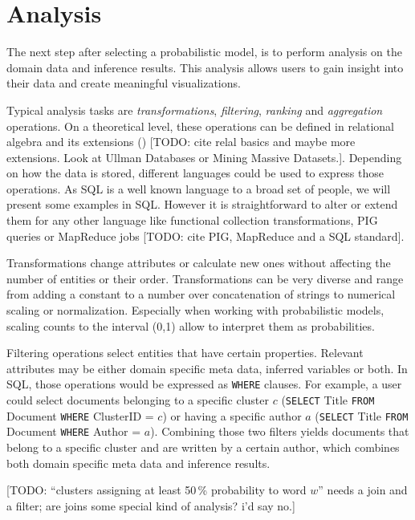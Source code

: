 \section{Analysis}

The next step after selecting a probabilistic model, is to perform analysis on the domain data and inference results. This analysis allows users to gain insight into their data and create meaningful visualizations.

Typical analysis tasks are \emph{transformations}, \emph{filtering}, \emph{ranking} and \emph{aggregation} operations. On a theoretical level, these operations can be defined in relational algebra and its extensions (\cite{ozsoyouglu1987extending, klug1982equivalence}) [TODO: cite relal basics and maybe more extensions. Look at Ullman Databases or Mining Massive Datasets.]. Depending on how the data is stored, different languages could be used to express those operations. As SQL is a well known language to a broad set of people, we will present some examples in SQL. However it is straightforward to alter or extend them for any other language like functional collection transformations, PIG queries or MapReduce jobs [TODO: cite PIG, MapReduce and a SQL standard].

Transformations change attributes or calculate new ones without affecting the number of entities or their order. Transformations can be very diverse and range from adding a constant to a number over concatenation of strings to numerical scaling or normalization. Especially when working with probabilistic models, scaling counts to the interval (0,1) allow to interpret them as probabilities.

Filtering operations select entities that have certain properties. Relevant attributes may be either domain specific meta data, inferred variables or both. In SQL, those operations would be expressed as \texttt{WHERE} clauses. For example, a user could select documents belonging to a specific cluster $c$ (\texttt{SELECT} Title \texttt{FROM} Document \texttt{WHERE} ClusterID = $c$) or having a specific author $a$ (\texttt{SELECT} Title \texttt{FROM} Document \texttt{WHERE} Author = $a$). Combining those two filters yields documents that belong to a specific cluster and are written by a certain author, which combines both domain specific meta data and inference results.

[TODO: ``clusters assigning at least 50\,\% probability to word $w$'' needs a join and a filter; are joins some special kind of analysis? i'd say no.]

